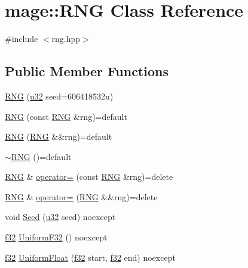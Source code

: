 \hypertarget{classmage_1_1_r_n_g}{}\section{mage\+:\+:R\+NG Class Reference}
\label{classmage_1_1_r_n_g}


{\ttfamily \#include $<$rng.\+hpp$>$}

\subsection*{Public Member Functions}
\begin{DoxyCompactItemize}
\item 
\hyperlink{classmage_1_1_r_n_g_a29f92a92c42d96549abab4e333c5a65e}{R\+NG} (\hyperlink{namespacemage_af2b398bf98eb10351f49cad73fe2cc73}{u32} seed=606418532u)
\item 
\hyperlink{classmage_1_1_r_n_g_ae85dd3ab6679a308610880779d65955a}{R\+NG} (const \hyperlink{classmage_1_1_r_n_g}{R\+NG} \&rng)=default
\item 
\hyperlink{classmage_1_1_r_n_g_aea109c4ab1644a5294d7c2c1031a50c9}{R\+NG} (\hyperlink{classmage_1_1_r_n_g}{R\+NG} \&\&rng)=default
\item 
\hyperlink{classmage_1_1_r_n_g_a20d24aabf31837e48a38b9ca221b0a9b}{$\sim$\+R\+NG} ()=default
\item 
\hyperlink{classmage_1_1_r_n_g}{R\+NG} \& \hyperlink{classmage_1_1_r_n_g_a38a0a4296338162fe105012cb4d13318}{operator=} (const \hyperlink{classmage_1_1_r_n_g}{R\+NG} \&rng)=delete
\item 
\hyperlink{classmage_1_1_r_n_g}{R\+NG} \& \hyperlink{classmage_1_1_r_n_g_ac9155db13a3d4b7f44a4f800085197a2}{operator=} (\hyperlink{classmage_1_1_r_n_g}{R\+NG} \&\&rng)=delete
\item 
void \hyperlink{classmage_1_1_r_n_g_ad717051d623a2118110d3e756c45dde8}{Seed} (\hyperlink{namespacemage_af2b398bf98eb10351f49cad73fe2cc73}{u32} seed) noexcept
\item 
\hyperlink{namespacemage_a6a44ad388483959dc4dff9f2aef91431}{f32} \hyperlink{classmage_1_1_r_n_g_a3499989188da06e9cb013526794451d3}{Uniform\+F32} () noexcept
\item 
\hyperlink{namespacemage_a6a44ad388483959dc4dff9f2aef91431}{f32} \hyperlink{classmage_1_1_r_n_g_aff7f8fcaf452916054ff5768a875aeb2}{Uniform\+Float} (\hyperlink{namespacemage_a6a44ad388483959dc4dff9f2aef91431}{f32} start, \hyperlink{namespacemage_a6a44ad388483959dc4dff9f2aef91431}{f32} end) noexcept
\end{DoxyCompactItemize}
